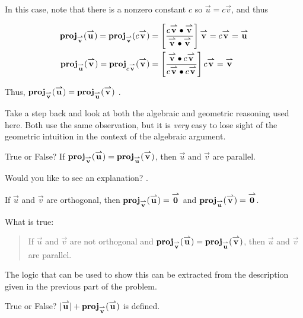 \documentclass{ximera}
\begin{document}
\begin{exercise}
\begin{selectAll}
\begin{hint}
\begin{problem}
\begin{question}
\begin{itemize}
In this case, note that there is a nonzero constant $c$ so $\vec{u} = c \vec{v}$, and thus

\begin{align*}
\proj_\vec{v}(\vec{u}) = \proj_\vec{v}(c\vec{v}) &=\left[\frac{c\vec{v} \dotp \vec{v}}{\vec{v} \dotp \vec{v}}\right] \vec{v} = c \vec{v} = \vec{u}\\
\proj_\vec{u}(\vec{v}) = \proj_{c\vec{v}}(\vec{v}) &= \left[\frac{\vec{v} \dotp c\vec{v}}{c\vec{v} \dotp c\vec{v}}\right] c \vec{v} = \vec{v}\\
\end{align*}

Thus,  $\proj_\vec{v}(\vec{u}) = \proj_\vec{u}(\vec{v})$  .

\end{itemize}

Take a step back and look at both the algebraic and geometric reasoning used here.  Both use the same observation, but it is \emph{very} easy to lose sight of the geometric intuition in the context of the algebraic argument.
\end{question}
\end{problem}
\begin{problem}
True or False?  If $\proj_\vec{v}(\vec{u}) = \proj_\vec{u}(\vec{v})$, then $\vec{u}$ and $\vec{v}$ are parallel.

Would you like to see an explanation?
.

\begin{question}
If $\vec{u}$ and $\vec{v}$ are orthogonal, then $\proj_\vec{v}(\vec{u}) = \vec{0}$ and $\proj_\vec{u}(\vec{v}) = \vec{0}$.  

What is true:

\begin{quote}
If $\vec{u}$ and $\vec{v}$ are not orthogonal and $\proj_\vec{v}(\vec{u}) = \proj_\vec{u}(\vec{v})$, then $\vec{u}$ and $\vec{v}$ are parallel.
\end{quote}

The logic that can be used to show this can be extracted from the description given in the previous part of the problem.
\end{question}
\end{problem}
\begin{problem}
True or False?  $|\vec{u}|+\proj_\vec{v}(\vec{u})$ is defined.


\end{problem}
\end{hint}
\end{selectAll}
\end{exercise}
\end{document}
